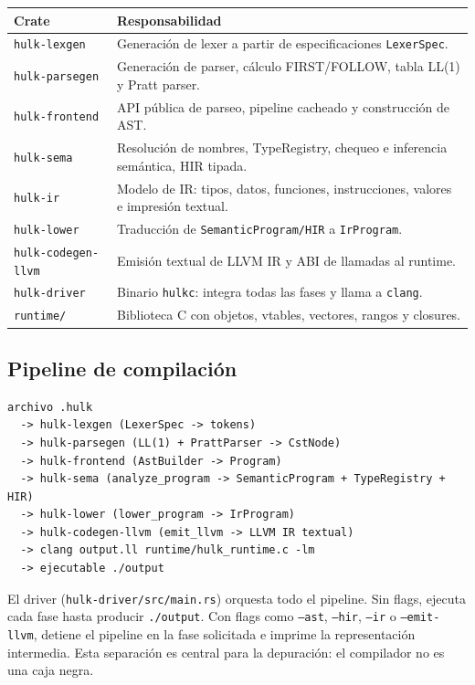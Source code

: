 \documentclass[12pt,letterpaper]{article}
\newcommand{\src}[1]{\texttt{#1}}
\begin{document}
\begin{longtable}{p{4.0cm}p{10.3cm}}
\toprule
\textbf{Crate} & \textbf{Responsabilidad} \\
\midrule
\src{hulk-lexgen} & Generación de lexer a partir de especificaciones \src{LexerSpec}. \\
\src{hulk-parsegen} & Generación de parser, cálculo FIRST/FOLLOW, tabla LL(1) y Pratt parser. \\
\src{hulk-frontend} & API pública de parseo, pipeline cacheado y construcción de AST. \\
\src{hulk-sema} & Resolución de nombres, TypeRegistry, chequeo e inferencia semántica, HIR tipada. \\
\src{hulk-ir} & Modelo de IR: tipos, datos, funciones, instrucciones, valores e impresión textual. \\
\src{hulk-lower} & Traducción de \src{SemanticProgram/HIR} a \src{IrProgram}. \\
\src{hulk-codegen-llvm} & Emisión textual de LLVM IR y ABI de llamadas al runtime. \\
\src{hulk-driver} & Binario \src{hulkc}: integra todas las fases y llama a \src{clang}. \\
\src{runtime/} & Biblioteca C con objetos, vtables, vectores, rangos y closures. \\
\bottomrule
\end{longtable}

\subsection{Pipeline de compilación}

\begin{lstlisting}[language=IR,caption={Pipeline completo del compilador}]
archivo .hulk
  -> hulk-lexgen (LexerSpec -> tokens)
  -> hulk-parsegen (LL(1) + PrattParser -> CstNode)
  -> hulk-frontend (AstBuilder -> Program)
  -> hulk-sema (analyze_program -> SemanticProgram + TypeRegistry + HIR)
  -> hulk-lower (lower_program -> IrProgram)
  -> hulk-codegen-llvm (emit_llvm -> LLVM IR textual)
  -> clang output.ll runtime/hulk_runtime.c -lm
  -> ejecutable ./output
\end{lstlisting}

El driver (\src{hulk-driver/src/main.rs}) orquesta todo el pipeline. Sin flags, ejecuta cada fase hasta producir \src{./output}. Con flags como \src{--ast}, \src{--hir}, \src{--ir} o \src{--emit-llvm}, detiene el pipeline en la fase solicitada e imprime la representación intermedia. Esta separación es central para la depuración: el compilador no es una caja negra.
\end{document}
